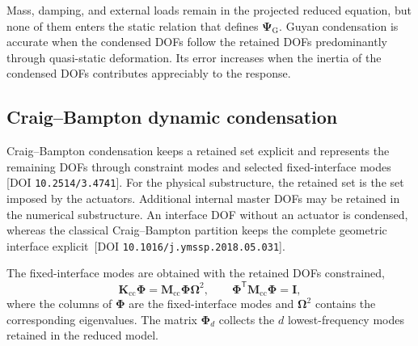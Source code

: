 \documentclass[11pt]{article}
\newcommand{\rev}[1]{{\color{red}#1}}
\newenvironment{revision}{\begingroup\color{red}}{\endgroup}
\begin{document}
\begin{revision}
Mass, damping, and external loads remain in the projected reduced equation, but none of them enters the static relation that defines \(\bm{\Psi}_{\mathrm{G}}\). Guyan condensation is accurate when the condensed DOFs follow the retained DOFs predominantly through quasi-static deformation. Its error increases when the inertia of the condensed DOFs contributes appreciably to the response.
\end{revision}

\subsection{Craig--Bampton dynamic condensation}\label{sec:cb-condensation}

Craig--Bampton condensation keeps a retained set explicit and represents the remaining DOFs through constraint modes and selected fixed-interface modes \cite{CraigBampton1968}\,\rev{[DOI \nolinkurl{10.2514/3.4741}]}. 
\begin{revision}
For the physical substructure, the retained set is the set imposed by the actuators. Additional internal master DOFs may be retained in the numerical substructure. An interface DOF without an actuator is condensed, whereas the classical Craig--Bampton partition keeps the complete geometric interface explicit \cite{Krattiger2019}\,\rev{[DOI \nolinkurl{10.1016/j.ymssp.2018.05.031}]}.
\end{revision}

The fixed-interface modes are obtained with the retained DOFs constrained,
\begin{equation}
    \mathbf{K}_{\mathrm{cc}}\bm{\Phi}
    =\mathbf{M}_{\mathrm{cc}}\bm{\Phi}\bm{\Omega}^{2},
    \qquad
    \bm{\Phi}^{\mathsf{T}}\mathbf{M}_{\mathrm{cc}}\bm{\Phi}=\mathbf{I},
    \label{eq:fixed-interface-modes}
\end{equation}
where the columns of \(\bm{\Phi}\) are the fixed-interface modes and \(\bm{\Omega}^{2}\) contains the corresponding eigenvalues. The matrix \(\bm{\Phi}_{d}\) collects the \(d\) lowest-frequency modes retained in the reduced model.
\end{document}
